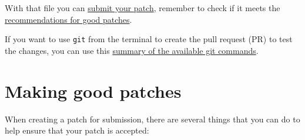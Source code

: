 \documentclass[
]{book}
\begin{document}
With that file you can \hyperref[SubmitPatches]{submit your patch}, remember to check if it meets the \hyperref[GoodPatches]{recommendations for good patches}.

If you want to use \texttt{git} from the terminal to create the pull request (PR) to test the changes, you can use this \href{https://about.gitlab.com/images/press/git-cheat-sheet.pdf}{summary of the available git commands}.

\section{Making good patches}\label{GoodPatches}

When creating a patch for submission, there are several things that you can do to help ensure that your patch is accepted:
\end{document}
